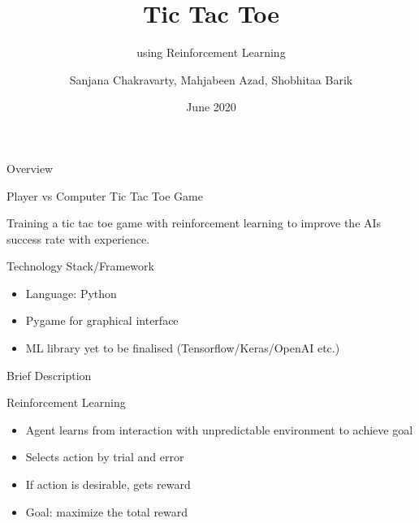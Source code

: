 \documentclass[14pt]{beamer}
\title[WTEF 2020]{Tic Tac Toe}
\subtitle{using Reinforcement Learning}
\author[Group 12]{Sanjana Chakravarty, Mahjabeen Azad, Shobhitaa Barik}
\date{June 2020}
\begin{document}
\begin{frame}
    \titlepage
\end{frame}

\begin{frame}{Overview}
    \begin{center}
        \textcolor{myAmber}{Player vs Computer Tic Tac Toe Game}
    \end{center}
   
    \begin{center}
    Training a tic tac toe game with reinforcement learning to improve the AI\textquotesingle s success rate with experience.
    \end{center}
\end{frame}

\begin{frame}{Technology Stack/Framework}
        \begin{itemize}
            \item Language: Python
            \item Pygame for graphical interface 
            \item ML library yet to be finalised (Tensorflow/Keras/OpenAI etc.)
        \end{itemize}
\end{frame}

\begin{frame}{Brief Description}
    \begin{block}{Reinforcement Learning}        
        \begin{itemize}
            \item<1-> Agent learns from interaction with unpredictable environment to achieve goal
            \item<2-> Selects action by trial and error
            \item<3-> If action is desirable, gets reward
            \item<4-> Goal: maximize the total reward
        \end{itemize}
    \end{block}
\end{frame}
\end{document}
